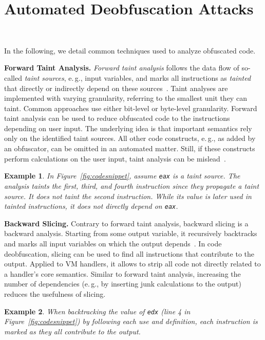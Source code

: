 \documentclass[letterpaper,twocolumn,10pt]{article}
\newcommand{\eg}{e.\,g.,\xspace}
\theoremstyle{customexample}
\newtheorem{example}{Example}
\theoremstyle{customexperiment}
\begin{document}
\section{Automated Deobfuscation Attacks}~\label{sec:background:attacks}

In the following, we detail common techniques used to analyze obfuscated code.

\textbf{Forward Taint Analysis.}
\emph{Forward taint analysis} follows the data flow of so-called \emph{taint sources}, \eg input variables, and marks all instructions as \emph{tainted} that directly or indirectly depend on these sources~\cite{schwartz2010all, yadegari2015generic, yadegari2014bit, sharif2009automatic}. Taint analyses are implemented with varying granularity, referring to the smallest unit they can taint. Common approaches use either bit-level or byte-level granularity.
Forward taint analysis can be used to reduce obfuscated code to the instructions depending on user input. The underlying idea is that important semantics rely only on the identified taint sources. All other code constructs, \eg as added by an obfuscator, can be omitted in an automated matter. Still, if these constructs perform calculations on the user input, taint analysis can be mislead~\cite{cavallaro2007anti,sarwar2013effectiveness}.
\begin{example}\label{example:taint}
In Figure~\ref{fig:codesnippet}, assume \texttt{eax} is a taint source. The analysis taints the first, third, and fourth instruction since they propagate a taint source. It does \emph{not} taint the second instruction. While its value is later used in tainted instructions, it does not directly depend on \texttt{eax}.
\end{example}


\textbf{Backward Slicing.}
Contrary to forward taint analysis, backward slicing is a backward analysis. Starting from some output variable, it recursively backtracks and marks all input variables on which the output depends~\cite{yadegari2015generic,weiser1981program,danicic2018static}. 
In code deobfuscation, slicing can be used to find all instructions that contribute to the output. Applied to VM handlers, it allows to strip all code not directly related to a handler's core semantics. Similar to forward taint analysis, increasing the number of dependencies (\eg by inserting junk calculations to the output) reduces the usefulness of slicing.
\begin{example}
When backtracking the value of \texttt{edx} (line 4 in Figure~\ref{fig:codesnippet}) by following each use and definition, each instruction is marked as they all contribute to the output.
\end{example}
\end{document}
